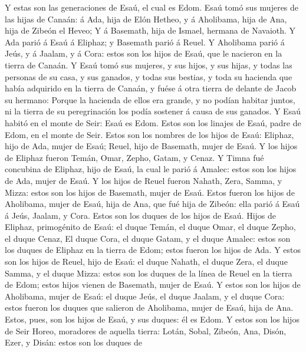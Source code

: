  Y estas son las generaciones de Esaú, el cual es Edom.
 Esaú tomó sus mujeres de las hijas de Canaán: á Ada, hija
de Elón Hetheo, y á Aholibama, hija de Ana, hija de Zibeón el Heveo;
 Y á Basemath, hija de Ismael, hermana de Navaioth.
 Y Ada parió á Esaú á Eliphaz; y Basemath parió á Reuel.
 Y Aholibama parió á Jeús, y á Jaalam, y á Cora: estos son
los hijos de Esaú, que le nacieron en la tierra de Canaán. 
Y Esaú tomó sus mujeres, y sus hijos, y sus hijas, y todas las personas
de su casa, y sus ganados, y todas sus bestias, y toda su hacienda que
había adquirido en la tierra de Canaán, y fuése á otra tierra de delante
de Jacob su hermano:  Porque la hacienda de ellos era
grande, y no podían habitar juntos, ni la tierra de su peregrinación los
podía sostener á causa de sus ganados.  Y Esaú habitó en el
monte de Seir: Esaú es Edom.  Estos son los linajes de Esaú,
padre de Edom, en el monte de Seir.  Estos son los nombres
de los hijos de Esaú: Eliphaz, hijo de Ada, mujer de Esaú; Reuel, hijo
de Basemath, mujer de Esaú.  Y los hijos de Eliphaz fueron
Temán, Omar, Zepho, Gatam, y Cenaz.  Y Timna fué concubina
de Eliphaz, hijo de Esaú, la cual le parió á Amalec: estos son los hijos
de Ada, mujer de Esaú.  Y los hijos de Reuel fueron Nahath,
Zera, Samma, y Mizza: estos son los hijos de Basemath, mujer de Esaú.
 Estos fueron los hijos de Aholibama, mujer de Esaú, hija
de Ana, que fué hija de Zibeón: ella parió á Esaú á Jeús, Jaalam, y
Cora.  Estos son los duques de los hijos de Esaú. Hijos de
Eliphaz, primogénito de Esaú: el duque Temán, el duque Omar, el duque
Zepho, el duque Cenaz,  El duque Cora, el duque Gatam, y el
duque Amalec: estos son los duques de Eliphaz en la tierra de Edom;
estos fueron los hijos de Ada.  Y estos son los hijos de
Reuel, hijo de Esaú: el duque Nahath, el duque Zera, el duque Samma, y
el duque Mizza: estos son los duques de la línea de Reuel en la tierra
de Edom; estos hijos vienen de Basemath, mujer de Esaú.  Y
estos son los hijos de Aholibama, mujer de Esaú: el duque Jeús, el duque
Jaalam, y el duque Cora: estos fueron los duques que salieron de
Aholibama, mujer de Esaú, hija de Ana.  Estos, pues, son
los hijos de Esaú, y sus duques: él es Edom.  Y estos son
los hijos de Seir Horeo, moradores de aquella tierra: Lotán, Sobal,
Zibeón, Ana,  Disón, Ezer, y Disán: estos son los duques de
